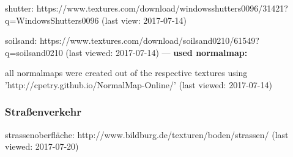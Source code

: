\documentclass{Paper}
\begin{document}
\begin{appendix}
shutter:
https://www.textures.com/download/windowsshutters0096/31421?q=WindowsShutters0096
(last view: 2017-07-14)

soilsand:
https://www.textures.com/download/soilsand0210/61549?q=soilsand0210
(last viewed: 2017-07-14)
---
\textbf{used normalmap:}

all normalmaps were created out of the respective textures using 'http://cpetry.github.io/NormalMap-Online/'
(last viewed: 2017-07-14)

\subsubsection{Straßenverkehr}

strassenoberfläche:
http://www.bildburg.de/texturen/boden/strassen/
(last viewed: 2017-07-20)


\end{appendix}

\vfill %
\end{document}
